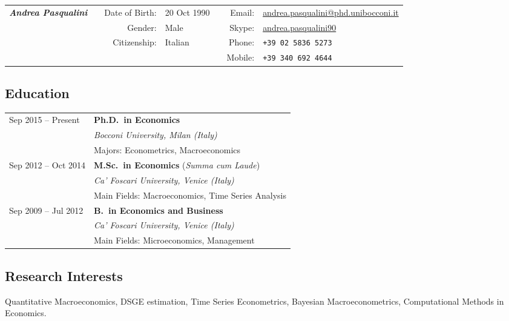 \documentclass[a4paper,10pt]{article}
\makeatletter
\newlength{\leftcolumn}
\newlength{\maincolumn}
\newcommand{\email}{{\href{mailto:andrea.pasqualini@phd.unibocconi.it}{andrea.pasqualini@phd.unibocconi.it}}}
\newcommand{\skype}{{\href{skype:andrea.pasqualini90}{andrea.pasqualini90}}}
\newcommand{\phone}{\tt +39~02~5836~5273}
\newcommand{\mobile}{\tt +39~340~692~4644}
\newcommand{\cafoscari}{\emph{Ca' Foscari University, Venice (Italy)}}
\newcommand{\bocconi}{\emph{Bocconi University, Milan (Italy)}}
\makeatother
\begin{document}
	{\hspace{-2cm}
		\small
		\begin{tabular}{lcrlcrl}
			\multirow{4}{*}{\LARGE\itshape\bfseries Andrea Pasqualini}
			&& Date of Birth: 	& 20 Oct 1990 	&& Email: 	& \email 	\\
			&& Gender: 			& Male 			&& Skype:	& \skype 	\\
			&& Citizenship: 	& Italian 		&& Phone: 	& \phone 	\\
			&& 					& 				&& Mobile: 	& \mobile \\ \hline
		\end{tabular}
	}

	\subsection*{Education}
		\begin{longtable}{p{\leftcolumn}p{\maincolumn}}
			Sep 2015 -- Present 	& \textbf{Ph.D.~in Economics} \\
									& \bocconi \\
									& Majors: Econometrics, Macroeconomics \vspace{1em}\\
			Sep 2012 -- Oct 2014 	& \textbf{M.Sc.~in Economics} (\emph{Summa cum Laude}) \\
									& \cafoscari \\
									& Main Fields: Macroeconomics, Time Series Analysis \vspace{1em}\\
			Sep 2009 -- Jul 2012 	& \textbf{B.~in Economics and Business} \\
									& \cafoscari \\
		 							& Main Fields: Microeconomics, Management \vspace{1em}
		\end{longtable}

	\subsection*{Research Interests}
		Quantitative Macroeconomics, DSGE estimation, Time Series Econometrics, Bayesian Macroeconometrics, Computational Methods in Economics.


		\vspace{2em}
\end{document}

